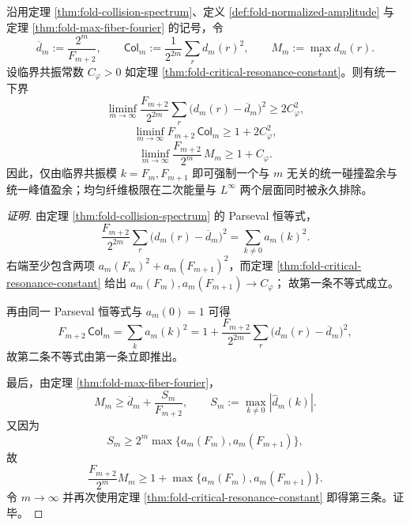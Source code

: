 \begin{conclusion}[临界共振常数强制纤维谱的统一二次下界与峰值盈余]\label{con:xi-fold-critical-resonance-quadratic-and-peak-floor}
沿用定理 \ref{thm:fold-collision-spectrum}、定义 \ref{def:fold-normalized-amplitude} 与定理 \ref{thm:fold-max-fiber-fourier} 的记号，令
\[
\overline d_m:=\frac{2^m}{F_{m+2}},
\qquad
\mathsf{Col}_m:=\frac{1}{2^{2m}}\sum_{r} d_m(r)^2,
\qquad
M_m:=\max_r d_m(r).
\]
设临界共振常数 \(C_\varphi>0\) 如定理 \ref{thm:fold-critical-resonance-constant}。则有统一下界
\[
\liminf_{m\to\infty}
\frac{F_{m+2}}{2^{2m}}
\sum_r\bigl(d_m(r)-\overline d_m\bigr)^2
\ge 2C_\varphi^2,
\]
\[
\liminf_{m\to\infty}F_{m+2}\,\mathsf{Col}_m
\ge 1+2C_\varphi^2,
\]
\[
\liminf_{m\to\infty}\frac{F_{m+2}}{2^m}\,M_m
\ge 1+C_\varphi.
\]
因此，仅由临界共振模 \(k=F_m,F_{m+1}\) 即可强制一个与 \(m\) 无关的统一碰撞盈余与统一峰值盈余；均匀纤维极限在二次能量与 \(L^\infty\) 两个层面同时被永久排除。
\end{conclusion}
\begin{proof}[证明]
由定理 \ref{thm:fold-collision-spectrum} 的 Parseval 恒等式，
\[
\frac{F_{m+2}}{2^{2m}}
\sum_r\bigl(d_m(r)-\overline d_m\bigr)^2
=\sum_{k\ne 0} a_m(k)^2.
\]
右端至少包含两项 \(a_m(F_m)^2+a_m(F_{m+1})^2\)，而定理 \ref{thm:fold-critical-resonance-constant} 给出
\(
a_m(F_m),a_m(F_{m+1})\to C_\varphi
\)；
故第一条不等式成立。

再由同一 Parseval 恒等式与 \(a_m(0)=1\) 可得
\[
F_{m+2}\,\mathsf{Col}_m
=\sum_k a_m(k)^2
=1+\frac{F_{m+2}}{2^{2m}}
\sum_r\bigl(d_m(r)-\overline d_m\bigr)^2,
\]
故第二条不等式由第一条立即推出。

最后，由定理 \ref{thm:fold-max-fiber-fourier}，
\[
M_m\ge \overline d_m+\frac{S_m}{F_{m+2}},
\qquad
S_m:=\max_{k\ne 0}|\widehat d_m(k)|.
\]
又因为
\[
S_m\ge 2^m\max\{a_m(F_m),a_m(F_{m+1})\},
\]
故
\[
\frac{F_{m+2}}{2^m}M_m
\ge 1+\max\{a_m(F_m),a_m(F_{m+1})\}.
\]
令 \(m\to\infty\) 并再次使用定理 \ref{thm:fold-critical-resonance-constant} 即得第三条。证毕。
\end{proof}
